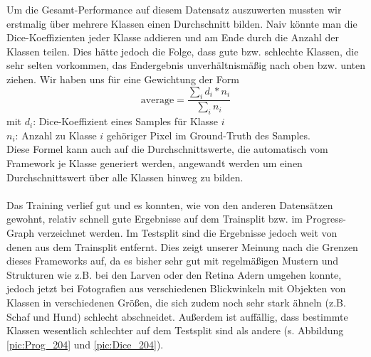 Um die Gesamt-Performance auf diesem Datensatz auszuwerten mussten wir erstmalig über mehrere Klassen einen Durchschnitt bilden. Naiv könnte man die Dice-Koeffizienten jeder Klasse addieren und am Ende durch die Anzahl der Klassen teilen. Dies hätte jedoch die Folge, dass gute bzw. schlechte Klassen, die sehr selten vorkommen, das Endergebnis unverhältnismäßig nach oben bzw. unten ziehen. Wir haben uns für eine Gewichtung der Form
\[\text{average} = \frac{\sum_i{d_i * n_i}}{\sum_i{n_i}}\]
mit $d_i$: Dice-Koeffizient eines Samples für Klasse $i$\\
$n_i$: Anzahl zu Klasse $i$ gehöriger Pixel im Ground-Truth des Samples.\\
Diese Formel kann auch auf die Durchschnittswerte, die automatisch vom Framework je Klasse generiert werden, angewandt werden um einen Durchschnittswert über alle Klassen hinweg zu bilden.\\\\
Das Training verlief gut und es konnten, wie von den anderen Datensätzen gewohnt, relativ schnell gute Ergebnisse auf dem Trainsplit bzw. im Progress-Graph verzeichnet werden. Im Testsplit sind die Ergebnisse jedoch weit von denen aus dem Trainsplit entfernt.
Dies zeigt unserer Meinung nach die Grenzen dieses Frameworks auf, da es bisher sehr gut mit regelmäßigen Mustern und Strukturen wie z.B. bei den Larven oder den Retina Adern umgehen konnte, jedoch jetzt bei Fotografien aus verschiedenen Blickwinkeln mit Objekten von Klassen in verschiedenen Größen, die sich zudem noch sehr stark ähneln (z.B. Schaf und Hund) schlecht abschneidet. Außerdem ist auffällig, dass bestimmte Klassen wesentlich schlechter auf dem Testsplit sind als andere (s. Abbildung \ref{pic:Prog_204} und \ref{pic:Dice_204}).

